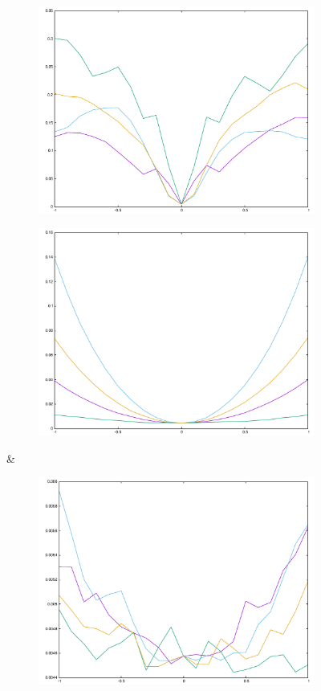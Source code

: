{\begin{figure}[H]
\begin{subfigure}{.33\textwidth}
	\includegraphics[width=\linewidth]{fig/ajherr/t3/L_chi.pdf}
\end{subfigure}%
\begin{subfigure}{.33\textwidth}
	\includegraphics[width=\linewidth]{fig/ajherr/t3/M_chi.pdf}
\end{subfigure}&
\begin{subfigure}{.33\textwidth}
	\includegraphics[width=\linewidth]{fig/ajherr/t3/S_chi.pdf}

\end{subfigure}
\end{figure}}
